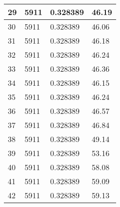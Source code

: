 \begin{table}
\begin{longtable}{ | l | l | l | l |}
    29 & 5911 & 0.328389 & 46.19 \\ \hline
    30 & 5911 & 0.328389 & 46.06 \\ \hline
    31 & 5911 & 0.328389 & 46.18 \\ \hline
    32 & 5911 & 0.328389 & 46.24 \\ \hline
    33 & 5911 & 0.328389 & 46.36 \\ \hline
    34 & 5911 & 0.328389 & 46.15 \\ \hline
    35 & 5911 & 0.328389 & 46.24 \\ \hline
    36 & 5911 & 0.328389 & 46.57 \\ \hline
    37 & 5911 & 0.328389 & 46.84 \\ \hline
    38 & 5911 & 0.328389 & 49.14 \\ \hline
    39 & 5911 & 0.328389 & 53.16 \\ \hline
    40 & 5911 & 0.328389 & 58.08 \\ \hline
    41 & 5911 & 0.328389 & 59.09 \\ \hline
    42 & 5911 & 0.328389 & 59.13 \\ \hline
    \end{longtable}
\label{table:CPU result}
\end{table}
\bigskip

